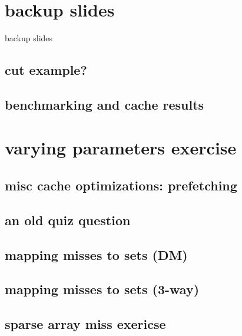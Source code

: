 \section{backup slides}
\begin{frame}{backup slides}
\end{frame}

\subsection{cut example?}


\subsection{benchmarking and cache results}



\section{varying parameters exercise}


\subsection{misc cache optimizations: prefetching}


\subsection{an old quiz question}


\subsection{mapping misses to sets (DM)}

\subsection{mapping misses to sets (3-way)}


\subsection{sparse array miss exericse}


